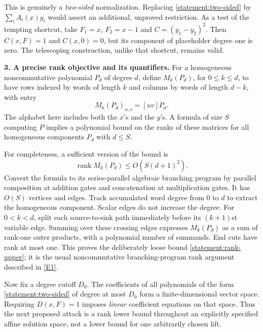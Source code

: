 \documentclass[11pt,a4paper]{article}
\newcommand{\eref}[2]{\hyperlink{extra:#1:#2}{[E#2]}}
\numberwithin{equation}{section}
\begin{document}
This is genuinely a \emph{two-sided} normalization. Replacing
\eqref{statement:two-sided} by $\sum_i A_i(x)y_i$ would assert an additional,
unproved restriction. As a test of the tempting shortcut, take
$F_1=x$, $F_2=x-1$ and $C=(y_1-y_2)^2$. Then $C(x,F)=1$ and $C(x,0)=0$,
but its component of placeholder degree one is zero. The telescoping
construction, unlike that shortcut, remains valid.

\medskip
\textbf{3. A precise rank objective and its quantifiers.}
For a homogeneous noncommutative polynomial $P_d$ of degree $d$, define
$M_k(P_d)$, for $0\leq k\leq d$, to have rows indexed by words of length $k$
and columns by words of length $d-k$, with entry
\[
 M_k(P_d)_{u,v}=[uv]P_d.
\]
The alphabet here includes both the $x$'s and the $y$'s. A formula of size $S$
computing $P$ implies a polynomial bound on the ranks of these matrices for
all homogeneous components $P_d$ with $d\leq S$.

For completeness, a sufficient version of the bound is
\begin{equation}\label{statement:rank-upper}
 \operatorname{rank}M_k(P_d)\leq O(S(d+1)^2).
\end{equation}
Convert the formula to its series-parallel algebraic branching program by
parallel composition at addition gates and concatenation at multiplication
gates. It has $O(S)$ vertices and edges. Track accumulated word degree from
$0$ to $d$ to extract the homogeneous component. Scalar edges do not increase
the degree. For $0<k<d$, split each source-to-sink path immediately before its
$(k+1)$st variable edge. Summing over these crossing edges expresses
$M_k(P_d)$ as a sum of rank-one outer products, with a polynomial number of
summands. End cuts have rank at most one. This proves the deliberately loose
bound \eqref{statement:rank-upper}; it is the usual noncommutative
branching-program rank argument described in \eref{statement}{1}.

Now fix a degree cutoff $D_0$. The coefficients of all polynomials of the form
\eqref{statement:two-sided} of degree at most $D_0$ form a finite-dimensional vector
space. Requiring $D(x,F)=1$ imposes \emph{linear} coefficient equations on
that space. Thus the next proposed attack is a rank lower bound throughout
an explicitly specified affine solution space, not a lower bound for one
arbitrarily chosen lift.
\end{document}
